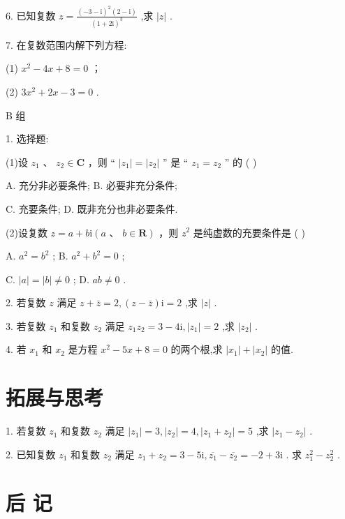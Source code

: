 \documentclass[10pt]{article}
\begin{document}
6. 已知复数 \(z = \frac{{\left( -3 - \mathrm{i}\right) }^{2}\left( {2 - \mathrm{i}}\right) }{{\left( 1 + 2\mathrm{i}\right) }^{3}}\) ,求 \(\left| z\right|\) .

7. 在复数范围内解下列方程:

(1) \({x}^{2} - {4x} + 8 = 0\) ；

(2) \(3{x}^{2} + {2x} - 3 = 0\) .

B 组

1. 选择题:

(1)设 \({z}_{1}\text{ 、 }{z}_{2} \in  \mathbf{C}\) ，则 “ \(\left| {z}_{1}\right|  = \left| {z}_{2}\right|\) ” 是 “ \({z}_{1} = {z}_{2}\) ” 的 ( )

A. 充分非必要条件; B. 必要非充分条件;

C. 充要条件; D. 既非充分也非必要条件.

(2)设复数 \(z = a + b\mathrm{i}\left( {a\text{ 、 }b \in  \mathbf{R}}\right)\) ，则 \({z}^{2}\) 是纯虚数的充要条件是 ( )

A. \({a}^{2} = {b}^{2}\) ; B. \({a}^{2} + {b}^{2} = 0\) ;

C. \(\left| a\right|  = \left| b\right|  \neq  0\) ; D. \({ab} \neq  0\) .

2. 若复数 \(z\) 满足 \(z + \bar{z} = 2,\left( {z - \bar{z}}\right) \mathrm{i} = 2\) ,求 \(\left| z\right|\) .

3. 若复数 \({z}_{1}\) 和复数 \({z}_{2}\) 满足 \({z}_{1}{z}_{2} = 3 - 4\mathrm{i},\left| {z}_{1}\right|  = 2\) ,求 \(\left| {z}_{2}\right|\) .

4. 若 \({x}_{1}\) 和 \({x}_{2}\) 是方程 \({x}^{2} - {5x} + 8 = 0\) 的两个根,求 \(\left| {x}_{1}\right|  + \left| {x}_{2}\right|\) 的值.

\section*{拓展与思考}

1. 若复数 \({z}_{1}\) 和复数 \({z}_{2}\) 满足 \(\left| {z}_{1}\right|  = 3,\left| {z}_{2}\right|  = 4,\left| {{z}_{1} + {z}_{2}}\right|  = 5\) ,求 \(\left| {{z}_{1} - {z}_{2}}\right|\) .

2. 已知复数 \({z}_{1}\) 和复数 \({z}_{2}\) 满足 \({z}_{1} + {z}_{2} = 3 - 5\mathrm{i},\overline{{z}_{1}} - \overline{{z}_{2}} =  - 2 + 3\mathrm{i}\) . 求 \({z}_{1}^{2} - {z}_{2}^{2}\) .

\section*{后 记}
\end{document}
